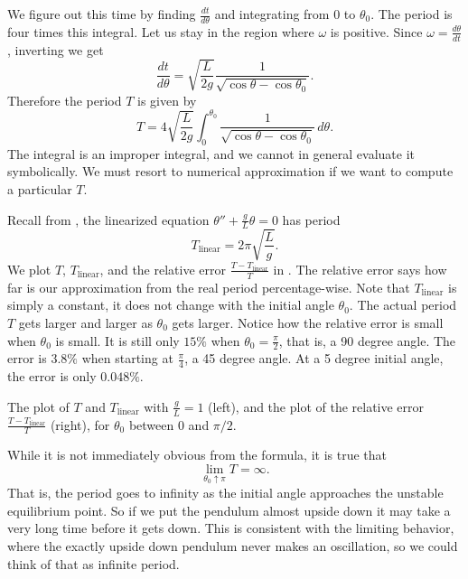 \documentclass{ximera}
\begin{document}
We figure out this time by finding $\frac{dt}{d\theta}$ and integrating from $0$ to $\theta_0$. The period is four times this integral.  Let us stay in the region where $\omega$ is positive. Since $\omega = \frac{d\theta}{dt}$, inverting we get
\begin{equation*}
    \frac{dt}{d\theta} = \sqrt{\frac{L}{2g}} \frac{1}{\sqrt{\cos \theta - \cos \theta_0 }} .
\end{equation*}
Therefore the period $T$ is given by
\begin{equation*}
    T = 4 \sqrt{\frac{L}{2g}} \int_0^{\theta_0} \frac{1}{\sqrt{\cos \theta - \cos \theta_0 }}\, d\theta .
\end{equation*}
The integral is an improper integral, and we cannot in general evaluate it symbolically.  We must resort to numerical approximation if we want to compute a particular $T$.

Recall from , the linearized equation $\theta''+\frac{g}{L}\theta = 0$ has period
\begin{equation*}
    T_{\text{linear}} = 2\pi \sqrt{\frac{L}{g}} .
\end{equation*}
We plot $T$, $T_{\text{linear}}$, and the relative error $\frac{T-T_{\text{linear}}}{T}$ in .  The relative error says how far is our approximation from the real period percentage-wise. Note that $T_{\text{linear}}$ is simply a constant, it does not change with the initial angle $\theta_0$.  The actual period $T$ gets larger and larger as $\theta_0$ gets larger. Notice how the relative error is small when $\theta_0$ is small.  It is still only $15\%$ when $\theta_0 = \frac{\pi}{2}$, that is, a 90 degree angle.  The error is $3.8\%$ when starting at $\frac{\pi}{4}$, a 45 degree angle.  At a 5 degree initial angle, the error is only $0.048 \%$.

\begin{myfig}
    \capstart
    \caption{The plot of $T$ and $T_{\text{linear}}$ with $\frac{g}{L} = 1$ (left), and the plot of the relative error $\frac{T-T_{\text{linear}}}{T}$ (right), for $\theta_0$ between 0 and $\pi/2$. \label{fig:TvsT0}}
\end{myfig}

While it is not immediately obvious from the formula, it is true that
\begin{equation*}
    \lim_{\theta_0 \uparrow \pi} T = \infty .
\end{equation*}
That is, the period goes to infinity as the initial angle approaches the unstable equilibrium point.  So if we put the pendulum almost upside down it may take a very long time before it gets down.  This is consistent with the limiting behavior, where the exactly upside down pendulum never makes an oscillation, so we could think of that as infinite period.
\end{document}
